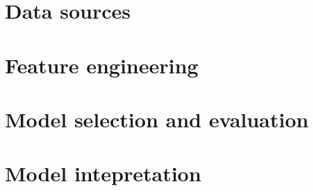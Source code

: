 \section{Data sources}


\section{Feature engineering}


\section{Model selection and evaluation}


\section{Model intepretation}